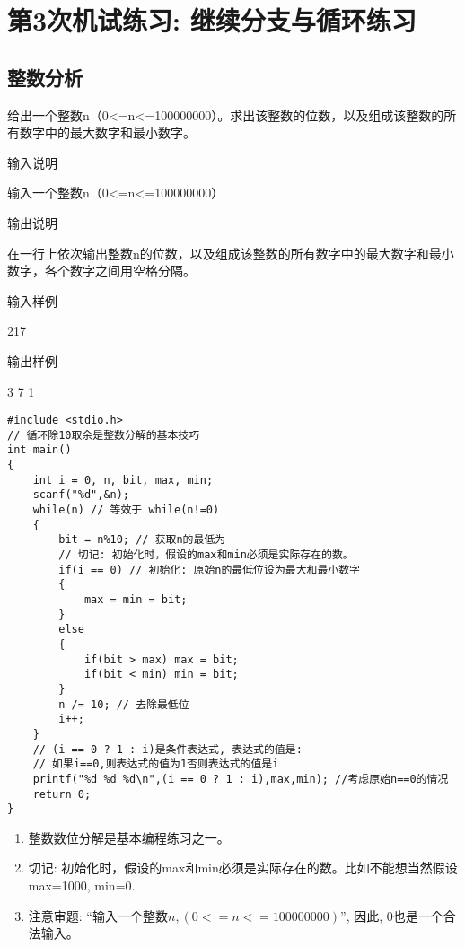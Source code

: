 %
%
%
\chapter{第3次机试练习: 继续分支与循环练习}

\section{整数分析}
给出一个整数n（0<=n<=100000000）。求出该整数的位数，以及组成该整数的所有数字中的最大数字和最小数字。

输入说明
	
输入一个整数n（0<=n<=100000000）

输出说明
	
在一行上依次输出整数n的位数，以及组成该整数的所有数字中的最大数字和最小数字，各个数字之间用空格分隔。

输入样例
	
217

输出样例
	
3 7 1

\begin{lstlisting}
#include <stdio.h>
// 循环除10取余是整数分解的基本技巧
int main()
{
	int i = 0, n, bit, max, min;
	scanf("%d",&n);
	while(n) // 等效于 while(n!=0)
	{
		bit = n%10; // 获取n的最低为
		// 切记: 初始化时，假设的max和min必须是实际存在的数。
		if(i == 0) // 初始化: 原始n的最低位设为最大和最小数字
		{
			max = min = bit;
		}  
		else
		{
			if(bit > max) max = bit;
			if(bit < min) min = bit;
		}
		n /= 10; // 去除最低位
		i++;
	} 
	// (i == 0 ? 1 : i)是条件表达式, 表达式的值是:
	// 如果i==0,则表达式的值为1否则表达式的值是i
	printf("%d %d %d\n",(i == 0 ? 1 : i),max,min); //考虑原始n==0的情况 
	return 0;
} 
\end{lstlisting}

\begin{note}[知识点]
  \begin{enumerate}
  	\item 整数数位分解是基本编程练习之一。
  	\item 切记: 初始化时，假设的max和min必须是实际存在的数。比如不能想当然假设max=1000, min=0.
  	\item 注意审题: ``输入一个整数$n,(0<=n<=100000000)$'', 因此, 0也是一个合法输入。
  \end{enumerate}
  
\end{note}

